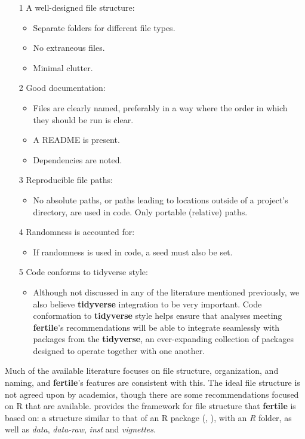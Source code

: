 \documentclass[APA,LATO1COL]{WileyNJD-v2}
\begin{document}
\begin{itemize}
\item[1] A well-designed file structure:
  \begin{itemize}
  \item Separate folders for different file types.
  \item No extraneous files.
  \item Minimal clutter.
  \end{itemize}
\item[2] Good documentation:
  \begin{itemize}
  \item Files are clearly named, preferably in a way where the order in which they should be run is clear.
  \item A README is present.
  \item Dependencies are noted.
  \end{itemize}
\item[3] Reproducible file paths:
  \begin{itemize}
  \item No absolute paths, or paths leading to locations outside of a project’s directory, are used in code. Only portable (relative) paths.
  \end{itemize}
\item[4] Randomness is accounted for:
  \begin{itemize}
  \item If randomness is used in code, a seed must also be set.
  \end{itemize}
\item[5] Code conforms to tidyverse style:
  \begin{itemize}
  \item Although not discussed in any of the literature mentioned previously, we also believe \textbf{tidyverse} integration to be very important. Code conformation to \textbf{tidyverse} style helps ensure that analyses meeting \textbf{fertile}'s recommendations will be able to integrate seamlessly with packages from the \textbf{tidyverse}, an ever-expanding collection of packages designed to operate together with one another.
  \end{itemize}
\end{itemize}

  
Much of the available literature focuses on file structure, organization, and naming, and \textbf{fertile}'s features are consistent with this. The ideal file structure is not agreed upon by academics, though there are some recommendations focused on R that are available. \cite{marwick2018packaging} provides the framework for file structure that \textbf{fertile} is based on: a structure similar to that of an R package (\cite{hadley-packages}, \cite{coreteam-extensions}), with an \textit{R} folder, as well as \textit{data}, \textit{data-raw}, \textit{inst} and \textit{vignettes}.
\end{document}
